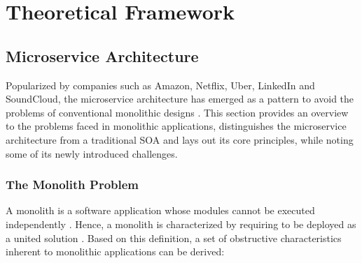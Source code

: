 
\chapter{Theoretical Framework}
\label{chp:theoretical-framework}

\section{Microservice Architecture}
\label{sec:microservice-architecture}

Popularized by companies such as Amazon, Netflix, Uber, LinkedIn and SoundCloud, the microservice architecture has emerged as a pattern to avoid the problems of conventional monolithic designs \cite[p.~847]{singh2017container} \cite[p.~584]{villamizar2015evaluating}. This section provides an overview to the problems faced in monolithic applications, distinguishes the microservice architecture from a traditional \acl{SOA} and lays out its core principles, while noting some of its newly introduced challenges.


\subsection{The Monolith Problem}
\label{sec:monolith-problem}

A monolith is a software application whose modules cannot be executed independently \cite[p.~1]{dragoni2017microservices}. Hence, a monolith is characterized by requiring to be deployed as a united solution \cite[p.~24]{dmitry2014micro}. Based on this definition, a set of obstructive characteristics inherent to monolithic applications can be derived:

